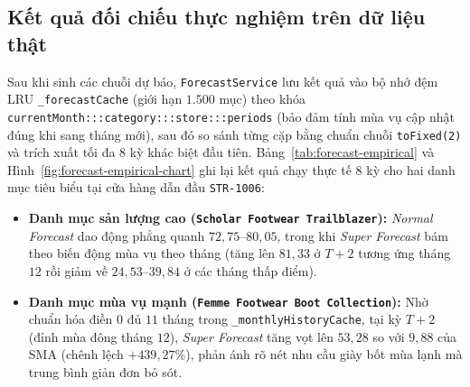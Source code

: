 \subsection{Kết quả đối chiếu thực nghiệm trên dữ liệu thật}
\label{sec:ch4-forecast-eval}
Sau khi sinh các chuỗi dự báo, \texttt{ForecastService} lưu kết quả vào bộ nhớ đệm LRU \texttt{_forecastCache} (giới hạn $1.500$ mục) theo khóa \texttt{currentMonth:::\allowbreak{}category:::\allowbreak{}store:::\allowbreak{}periods} (bảo đảm tính mùa vụ cập nhật đúng khi sang tháng mới), sau đó so sánh từng cặp bằng chuẩn chuỗi \texttt{toFixed(2)} và trích xuất tối đa $8$ kỳ khác biệt đầu tiên. Bảng~\ref{tab:forecast-empirical} và Hình~\ref{fig:forecast-empirical-chart} ghi lại kết quả chạy thực tế $8$ kỳ cho hai danh mục tiêu biểu tại cửa hàng dẫn đầu \texttt{STR-1006}:
\begin{itemize}[topsep=0pt, itemsep=1pt]
	\item \textbf{Danh mục sản lượng cao (\texttt{Scholar Footwear Trailblazer}):} \textit{Normal Forecast} dao động phẳng quanh $72{,}75$--$80{,}05$, trong khi \textit{Super Forecast} bám theo biến động mùa vụ theo tháng (tăng lên $81{,}33$ ở $T+2$ tương ứng tháng $12$ rồi giảm về $24{,}53$--$39{,}84$ ở các tháng thấp điểm).
	\item \textbf{Danh mục mùa vụ mạnh (\texttt{Femme Footwear Boot Collection}):} Nhờ chuẩn hóa điền $0$ đủ $11$ tháng trong \texttt{_monthlyHistoryCache}, tại kỳ $T+2$ (đỉnh mùa đông tháng $12$), \textit{Super Forecast} tăng vọt lên $53{,}28$ so với $9{,}88$ của SMA (chênh lệch $+439{,}27\%$), phản ánh rõ nét nhu cầu giày bốt mùa lạnh mà trung bình giản đơn bỏ sót.
\end{itemize}

